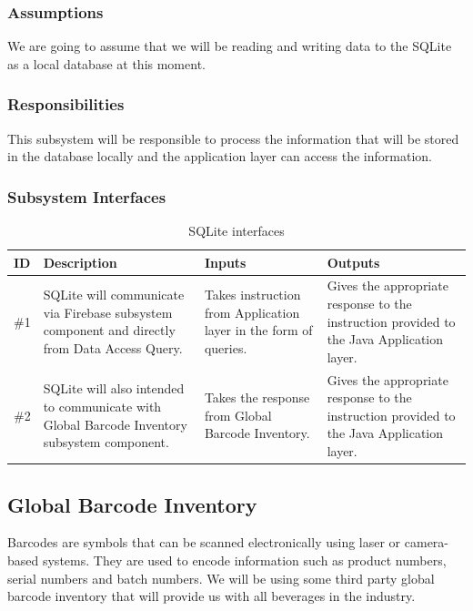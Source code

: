 \subsubsection{Assumptions}
We are going to assume that we will be reading and writing data to the SQLite as a local database at this moment.

\subsubsection{Responsibilities}
This subsystem will be responsible to process the information that will be stored in the database locally and the application layer can access the information. 

\subsubsection{Subsystem Interfaces}
\begin {table}[H]
\caption {SQLite interfaces} 
\begin{center}
    \begin{tabular}{ | p{1cm} | p{6cm} | p{3cm} | p{3cm} |}
    \hline
    ID & Description & Inputs & Outputs \\ \hline
    \#1 & SQLite will communicate via Firebase subsystem component and directly from Data Access Query. & Takes instruction from Application layer in the form of queries. & Gives the appropriate response to the instruction provided to the Java Application layer.\\ \hline
    \#2 & SQLite will also intended to communicate with Global Barcode Inventory subsystem component. & Takes the response from Global Barcode Inventory. & Gives the appropriate response to the instruction provided to the Java Application layer.\\ \hline
    \end{tabular}
\end{center}
\end{table}

\subsection{Global Barcode Inventory}
Barcodes are symbols that can be scanned electronically using laser or camera-based systems. They are used to encode information such as product numbers, serial numbers and batch numbers. We will be using some third party global barcode inventory that will provide us with all beverages in the industry.

